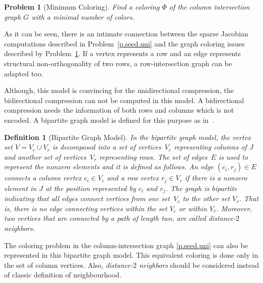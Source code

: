 \documentclass[12pt, oneside]{book}
\newtheorem{problem}{Problem}
\newtheorem{definition}{Definition}
\begin{document}
\begin{problem}[Minimum Coloring]
\label{p:mincol}
Find a coloring $\Phi$ of the column intersection graph $G$ with a minimal number of
colors.
\end{problem}
As it can be seen, there is an intimate connection between the sparse Jacobian computations described in
Problem~\ref{p.seed.uni} and 
the graph coloring issues described by Problem~\ref{p:mincol}.
If a vertex represents a row and an edge represents structural
non-orthogonality of two rows, a row-intersection graph can be adapted too.

Although, this model is convincing for the unidirectional compression, 
the bidirectional compression can not be computed in this model.
A bidirectional compression needs the information of both rows and columns which
is not encoded. A bipartite graph model is defined for this 
purpose as in~\cite{Coleman1996SaE,cv:ecs,hs:csj}. 

\begin{definition}[Bipartite Graph Model]
\label{d.bip.graph}
In the bipartite graph model, the vertex set $V=V_c\cup V_r$
is decomposed into a set of vertices~$V_c$ representing columns of $J$ and another set of
vertices~$V_r$ representing rows. The set of edges~$E$ is used to represent the nonzero
elements and it is defined as follows. An edge $(c_i , r_j) \in E$ connects a column
vertex $c_i \in V_c$ and a row vertex $r_j \in V_r$ if there is a nonzero element in $J$
at the position represented by $c_i$ and $r_j$. The graph is bipartite indicating that
all edges connect vertices from one set~$V_c$ to the other set $V_r$. That is, there is
no edge connecting vertices within the set $V_c$ or within $V_r$. Moreover, two vertices
that are connected by a path of length two, are called \emph{distance-$2$ neighbors}.
\end{definition}

The coloring problem in the column-intersection graph \ref{p.seed.uni} can also be represented in 
this bipartite graph model. This equivalent coloring is done only in the set of
column vertices. Also, \emph{distance-$2$ neighbors} should be considered instead of
classic definition of neighbourhood. 
\end{document}
